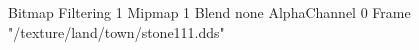 {Bitmap
	{Filtering 1}
	{Mipmap 1}
	{Blend none}
	{AlphaChannel 0}
	{Frame "/texture/land/town/stone111.dds"}
}
